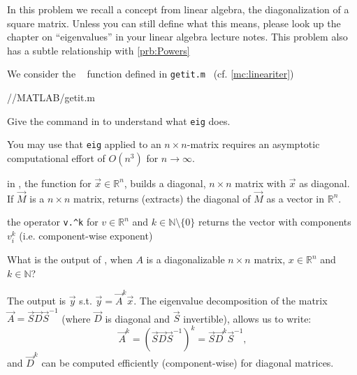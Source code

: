 
\begin{problem} \label{prb:lineariter} 
In this problem we recall a concept from linear algebra, the diagonalization
of a square matrix. Unless you can still define what this means, please look
up the chapter on ``eigenvalues'' in your linear algebra lecture notes. This
problem also has a subtle relationship with \ref{prb:Powers}

We consider the \Matlab~ function defined in \verb|getit.m|~ (cf. \cref{mc:lineariter})

{\problems/\chpt/MATLAB/getit.m}

\begin{hint}
  Give the command  in \Matlab{} to understand what \texttt{eig}
  does. 
\end{hint}

\begin{hint}
  You may use that \texttt{eig} applied to an $n\times n$-matrix requires an
  asymptotic computational effort of $O(n^{3})$ for $n\to\infty$.
\end{hint}

\begin{hint}
 in \Matlab, the function  for $\vec{x} \in \mathbb{R}^n$, builds a diagonal, $n \times n$ matrix with $\vec{x}$ as diagonal. If $\vec{M}$ is a $n \times n$ matrix,  returns (extracts) the diagonal of $\vec{M}$ as a vector in $\mathbb{R}^n$.
\end{hint}

\begin{hint}
 the operator \verb|v.^k| for $v \in \mathbb{R}^n$ and $k \in \mathbb{N} \setminus \{ 0 \}$ returns the vector with components $v_i ^k$ (i.e. component-wise exponent)
\end{hint}

\begin{subproblem}[2]
 What is the output of , when $A$ is a diagonalizable $n \times n$ matrix, $x \in \mathbb{R}^n$ and $k \in \mathbb{N}$?
 
 \begin{solution}
   The output is $\vec{y}$ s.t. $\vec{y} = \vec{A}^k \vec{x}$. The eigenvalue decomposition of the matrix $\vec{A} = \vec{S} \vec{D} \vec{S}^{-1}$ (where $\vec{D}$ is diagonal and $\vec{S}$ invertible), allows us to write:
   \[
    \vec{A}^k = (\vec{S} \vec{D} \vec{S}^{-1})^k = \vec{S} \vec{D}^k \vec{S}^{-1},
   \]
   and $\vec{D}^k$ can be computed efficiently (component-wise) for diagonal matrices.
 \end{solution}


\end{subproblem}
\end{problem}
